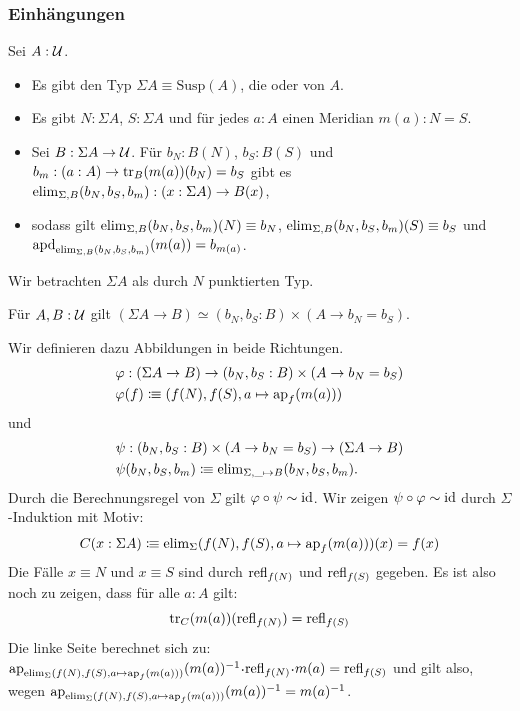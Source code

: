 \subsubsection*{Einhängungen}

\begin{regeln}
  Sei $A:\mathcal{U}$.
  \begin{itemize}
  \item Es gibt den Typ $\Sigma A\equiv\mathrm{Susp}(A)$, die  oder  von $A$.
  \item Es gibt $N:\Sigma A$, $S:\Sigma A$ und für jedes $a:A$ einen Meridian $m(a):N=S$.
  \item Sei $B:\Sigma A\to \mathcal{U}$. Für $b_N:B(N)$, $b_S:B(S)$ und $b_m:(a:A)\to \mathrm{tr}_B(m(a))(b_N)=b_S$
    gibt es $\mathrm{elim}_{\Sigma,B}(b_N,b_S,b_m):(x:\Sigma A)\to B(x)$,
  \item sodass gilt $\mathrm{elim}_{\Sigma,B}(b_N,b_S,b_m)(N)\equiv b_N$, $\mathrm{elim}_{\Sigma,B}(b_N,b_S,b_m)(S)\equiv b_S$ und $\mathrm{apd}_{\mathrm{elim}_{\Sigma,B}(b_N,b_S,b_m)}(m(a))= b_{m(a)}$.
  \end{itemize}
\end{regeln}

Wir betrachten $\Sigma A$ als durch $N$ punktierten Typ.

\begin{lemma}
  \label{suspension-eindeutigkeitsprinzip}
  Für $A,B:\mathcal{U}$ gilt $(\Sigma A\to B)\simeq (b_N,b_S:B)\times (A\to b_N=b_S)$.
\end{lemma}

\begin{beweis}
  Wir definieren dazu Abbildungen in beide Richtungen.
  \begin{align*}
    &\varphi : (\Sigma A\to B)\to (b_N,b_S:B)\times (A\to b_N=b_S) \\
    &\varphi(f) \vcentcolon\mspace{-1.2mu}\equiv (f(N),f(S),a\mapsto \mathrm{ap}_f(m(a)))
  \end{align*}
  und
  \begin{align*}
    &\psi : (b_N,b_S:B)\times (A\to b_N=b_S)\to (\Sigma A\to B) \\
    &\psi(b_N,b_S,b_m) \colonequiv \elim_{\Sigma,\_\mapsto B}(b_N,b_S,b_m)\rlap{.}
  \end{align*}
  Durch die Berechnungsregel von $\Sigma$ gilt $\varphi\circ\psi\sim\mathrm{id}$.
  Wir zeigen $\psi\circ\varphi\sim\mathrm{id}$ durch $\Sigma$-Induktion mit Motiv:
  \[
  C(x:\Sigma A)\vcentcolon\mspace{-1.2mu}\equiv \mathrm{elim}_\Sigma(f(N),f(S),a\mapsto \mathrm{ap}_f(m(a)))(x)=f(x)
  \]
  Die Fälle $x\equiv N$ und $x\equiv S$ sind durch $\mathrm{refl}_{f(N)}$ und $\mathrm{refl}_{f(S)}$ gegeben.
  Es ist also noch zu zeigen, dass für alle $a:A$ gilt:
  \[
  \mathrm{tr}_{C}(m(a))(\mathrm{refl}_{f(N)})=\mathrm{refl}_{f(S)}
  \]
  Die linke Seite berechnet sich zu: $\ap_{\elim_\Sigma(f(N),f(S),a\mapsto \ap_f(m(a)))}(m(a))^{-1}\kon\refl_{f(N)}\kon m(a)=\refl_{f(S)}$ und gilt also, wegen $\mathrm{ap}_{\mathrm{elim}_\Sigma(f(N),f(S),a\mapsto \mathrm{ap}_f(m(a)))}(m(a))^{-1}=m(a)^{-1}$.
\end{beweis}

